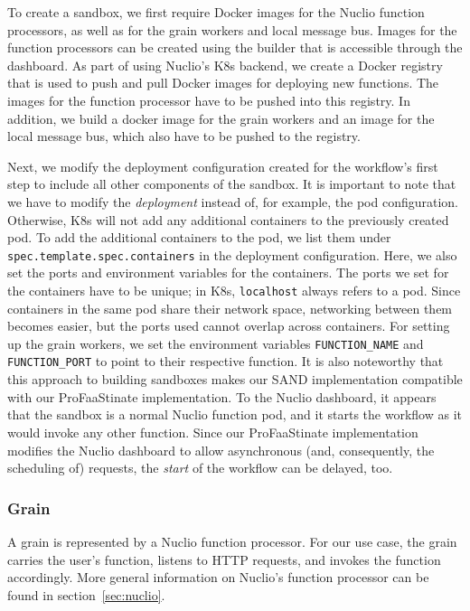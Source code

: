To create a sandbox, we first require Docker images for the Nuclio function processors, as well as for the grain workers and local message bus.
Images for the function processors can be created using the builder that is accessible through the dashboard. 
As part of using Nuclio's K8s backend, we create a Docker registry that is used to push and pull Docker images for deploying new functions.
The images for the function processor have to be pushed into this registry.
In addition, we build a docker image for the grain workers and an image for the local message bus, which also have to be pushed to the registry.

Next, we modify the deployment configuration created for the workflow's first step to include all other components of the sandbox.
It is important to note that we have to modify the \emph{deployment} instead of, for example, the pod configuration. 
Otherwise, K8s will not add any additional containers to the previously created pod.
To add the additional containers to the pod, we list them under \texttt{spec.template.spec.containers} in the deployment configuration.
Here, we also set the ports and environment variables for the containers. 
The ports we set for the containers have to be unique; in K8s, \texttt{localhost} always refers to a pod.
Since containers in the same pod share their network space, networking between them becomes easier, but the ports used cannot overlap across containers.
For setting up the grain workers, we set the environment variables \texttt{FUNCTION\_NAME} and \texttt{FUNCTION\_PORT} to point to their respective function. 
It is also noteworthy that this approach to building sandboxes makes our SAND implementation compatible with our ProFaaStinate implementation.
To the Nuclio dashboard, it appears that the sandbox is a normal Nuclio function pod, and it starts the workflow as it would invoke any other function. 
Since our ProFaaStinate implementation modifies the Nuclio dashboard to allow asynchronous (and, consequently, the scheduling of) requests, the \emph{start} of the workflow can be delayed, too.

\subsubsection{Grain}

A grain is represented by a Nuclio function processor. 
For our use case, the grain carries the user's function, listens to HTTP requests, and invokes the function accordingly.
More general information on Nuclio's function processor can be found in
section~\ref{sec:nuclio}. %

